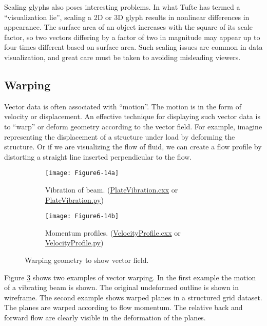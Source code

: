 Scaling glyphs also poses interesting problems. In what Tufte has termed a ``visualization lie'', \cite{Tufte83} scaling a 2D or 3D glyph results in nonlinear differences in appearance. The surface area of an object increases with the square of its scale factor, so two vectors differing by a factor of two in magnitude may appear up to four times different based on surface area. Such scaling issues are common in data visualization, and great care must be taken to avoiding misleading viewers.

\subsection{Warping}

Vector data is often associated with ``motion''. The motion is in the form of velocity or displacement. An effective technique for displaying such vector data is to ``warp'' or deform geometry according to the vector field. For example, imagine representing the displacement of a structure under load by deforming the structure. Or if we are visualizing the flow of fluid, we can create a flow profile by distorting a straight line inserted perpendicular to the flow.

\begin{figure}[htb]
	\begin{subfigure}[h]{0.48\linewidth}
	\texttt{[image: Figure6-14a]}
	\caption{Vibration of beam. (\href{https://lorensen.github.io/VTKExamples/site/Cxx/VisualizationAlgorithms/PlateVibration}{PlateVibration.cxx} or \href{https://lorensen.github.io/VTKExamples/site/Python/VisualizationAlgorithms/PlateVibration/}{PlateVibration.py})}\label{fig:Figure6-14a}
\end{subfigure}
	\hfill
	\begin{subfigure}[h]{0.48\linewidth}
		\texttt{[image: Figure6-14b]}
		\caption{Momentum profiles. (\href{https://lorensen.github.io/VTKExamples/site/Cxx/VisualizationAlgorithms/VelocityProfile}{VelocityProfile.cxx} or \href{https://lorensen.github.io/VTKExamples/site/Python/VisualizationAlgorithms/VelocityProfile/}{VelocityProfile.py})}\label{fig:Figure6-14b}
	\end{subfigure}
	\caption{Warping geometry to show vector field.}\label{fig:Figure6-14}
\end{figure}

Figure \ref{fig:Figure6-14} shows two examples of vector warping. In the first example the motion of a vibrating beam is shown. The original undeformed outline is shown in wireframe. The second example shows warped planes in a structured grid dataset. The planes are warped according to flow momentum. The relative back and forward flow are clearly visible in the deformation of the planes.

